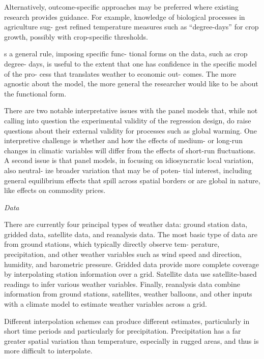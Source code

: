\documentclass[
]{book}
\begin{document}
Alternatively, outcome-specific approaches
may be preferred where existing research
provides guidance. For example, knowledge
of biological processes in agriculture sug-
gest refined temperature measures such as
``degree-days'' for crop growth, possibly with
crop-specific thresholds.

s a general rule, imposing specific func-
tional forms on the data, such as crop degree-
days, is useful to the extent that one has
confidence in the specific model of the pro-
cess that translates weather to economic out-
comes. The more agnostic about the model,
the more general the researcher would like
to be about the functional form.

There are two notable interpretative
issues with the panel models that, while
not calling into question the experimental
validity of the regression design, do raise
questions about their external validity for
processes such as global warming. One
interpretive challenge is whether and how
the effects of medium- or long-run changes
in climatic variables will differ from the
effects of short-run fluctuations. A second
issue is that panel models, in focusing on
idiosyncratic local variation, also neutral-
ize broader variation that may be of poten-
tial interest, including general equilibrium
effects that spill across spatial borders or are
global in nature, like effects on commodity
prices.

\emph{Data}

There are currently four principal types of
weather data: ground station data, gridded
data, satellite data, and reanalysis data.
The
most basic type of data are from ground stations,
which typically directly observe tem-
perature, precipitation, and other weather
variables such as wind speed and direction,
humidity, and barometric pressure. Gridded
data provide more complete coverage by
interpolating station information over a grid.
Satellite data use satellite-based readings
to infer various weather variables. Finally,
reanalysis data combine information from
ground stations, satellites, weather balloons,
and other inputs with a climate model to
estimate weather variables across a grid.

Different interpolation schemes
can produce different estimates, particularly
in short time periods and particularly for
precipitation. Precipitation has a far greater
spatial variation than temperature, especially
in rugged areas, and thus is more difficult
to interpolate.
\end{document}
